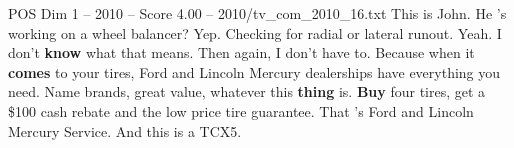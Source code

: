 \begin{textsample}{POS Dim 1 – 2010 – Score 4.00 – 2010/tv\_com\_2010\_16.txt}  \label{ex:f1_pos_067}
This is John.
He 's working on a wheel balancer?
Yep.
Checking for radial or lateral runout.
Yeah.
I don't \textbf{know} what that means.
Then again, I don't have to.
Because when it \textbf{comes} to your tires, Ford and Lincoln Mercury dealerships have everything you need.
Name brands, great value, whatever this \textbf{thing} is. \textbf{Buy} four tires, get a \$100 cash rebate and the low price tire guarantee.
That 's Ford and Lincoln Mercury Service.
And this is a TCX5.

\end{textsample}
